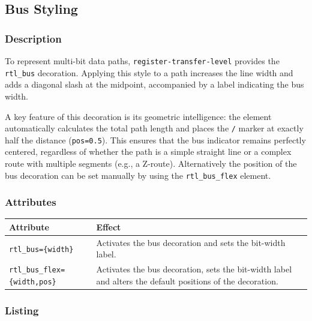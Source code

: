 \subsection{\sffamily Bus Styling}

    \subsubsection{\sffamily Description}
        To represent multi-bit data paths, \texttt{register-transfer-level} provides the \texttt{rtl\_bus} decoration. Applying this style to a path increases the line width and adds a diagonal slash at the midpoint, accompanied by a label indicating the bus width. 
        
        A key feature of this decoration is its geometric intelligence: the element automatically calculates the total path length and places the \texttt{/} marker at exactly half the distance (\texttt{pos=0.5}). This ensures that the bus indicator remains perfectly centered, regardless of whether the path is a simple straight line or a complex route with multiple segments (e.g., a Z-route).
        Alternatively the position of the bus decoration can be set manually by using the \texttt{rtl\_bus\_flex} element.
    \subsubsection{\sffamily Attributes}
    \begin{center}
        \begin{tabular}{lp{8cm}}
        \toprule
            \textbf{Attribute} & \textbf{Effect} \\
            \midrule
            \texttt{rtl\_bus=\{width\}} & Activates the bus decoration and sets the bit-width label. \\
            \midrule
            \texttt{rtl\_bus\_flex=\{width,pos\}} & Activates the bus decoration, sets the bit-width label and alters the default positions of the decoration. \\
            \bottomrule
        \end{tabular}
    \end{center}

    \subsubsection{\sffamily Listing}
\begin{RTLexample}
\end{RTLexample}

